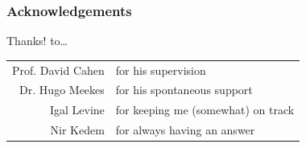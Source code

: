 \documentclass{beamer}
\begin{document}
\begin{frame}
\frametitle{Acknowledgements}
\begin{block}{Thanks! to\dots}
\centering
	\begin{tabular}{r l}
	\textcolor{RUred}{Prof. David Cahen} & for his supervision \\
	\textcolor{RUred}{Dr. Hugo Meekes} & for his spontaneous support \\
	\textcolor{RUred}{Igal Levine} & for keeping me (somewhat) on track \\
	\textcolor{RUred}{Nir Kedem} & for always having an answer
	\end{tabular}
\end{block}\end{frame}
\end{document}
